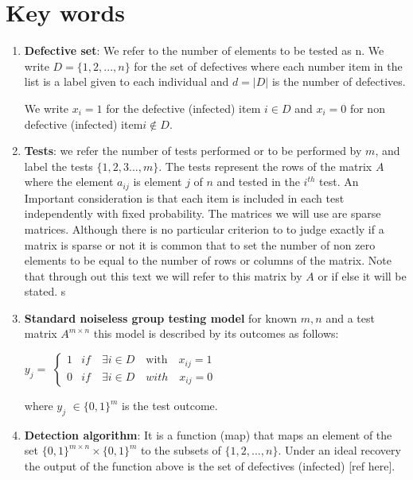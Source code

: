 \documentclass[12pt,a4paper]{article}
\begin{document}
	\section{Key words}
	\begin{enumerate}
		\item \textbf{Defective set}: We refer to the number of elements to be tested as n. We write $ D = \{1,2, ..., n\} $ for the set of defectives where each number item in the list is a label given to each individual  and $ d  = |D|$ is the number of defectives. 
		
		We write $ x_i  = 1$ for the defective (infected) item $ i \in D $ and $ x_i = 0 $ for non defective (infected) item$ i \notin D $. 
		\item \textbf{Tests}: we refer the number of tests performed or to be performed by $m$, and label the tests $ \{1,2,3 ..., m\} $. The tests represent the rows of the matrix $ A $ where the element $ a_{ij} $ is element $ j $ of $ n $ and tested in the $ i^{th} $ test. An Important consideration is that each item is included in each test independently with fixed probability. The matrices we will use are sparse matrices. Although there is no particular criterion to to judge exactly if a matrix is sparse or not it is common that to set the number of non zero elements to be equal to the number of rows or columns of the matrix. Note that through out this text we will refer to this matrix by $ A $ or if else it will be stated. s  
		 \item \textbf{Standard noiseless group testing model} for known $m,n$ and a test matrix $ A^{m\times n} $ this model is described by its outcomes as follows:
		
	 \begin{center} $y_{j} =$  
	  $\begin{cases}
	 	1 & if \quad \exists   i \in D  \quad \text{with}  \quad x_{ij} = 1\\ 
	 	0 & if \quad \exists   i \in D  \quad with  \quad x_{ij} = 0
		\end{cases}$
	\end{center}
where $ y_j $ $ \in \{0,1\}^m $ is the test outcome. 
		\item \textbf{Detection algorithm}: 
		It is a function (map) that maps an element of the set $ \{0,1\}^{m\times n} \times \{0,1\}^m $ to the subsets of $ \{1,2,..., n\} $. Under an ideal recovery the output of the function above is the set of defectives (infected) [ref here].  
		 
	\end{enumerate}      
	 
	 
	 
	 
\end{document}
